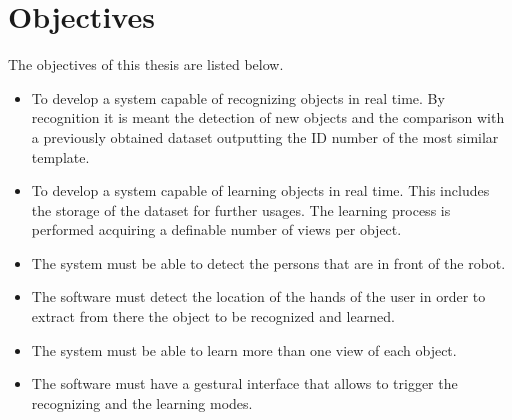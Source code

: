 \section{Objectives}
\label{objectives}

The objectives of this thesis are listed below. 

\begin{itemize}
	\item To develop a system capable of recognizing objects in real time. 
			By recognition it is meant the detection of new objects and the comparison with a previously obtained dataset outputting the ID number of the most similar template.
	\item To develop a system capable of learning objects in real time. 
			This includes the storage of the dataset for further usages.
			The learning process is performed acquiring a definable number of views per object. 
	\item The system must be able to detect the persons that are in front of the robot. 
	\item The software must detect the location of the hands of the user in order to extract from there the object to be recognized and learned. 
	\item The system must be able to learn more than one view of each object. 
	\item The software must have a gestural interface that allows to trigger the recognizing and the learning modes. 

\end{itemize}
\\



